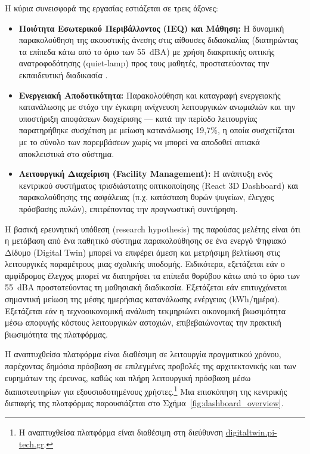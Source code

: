 Η κύρια συνεισφορά της εργασίας εστιάζεται σε τρεις άξονες:
\begin{itemize}
\item \textbf{Ποιότητα Εσωτερικού Περιβάλλοντος (\textlatin{IEQ}) και Μάθηση:} Η δυναμική παρακολούθηση της ακουστικής άνεσης στις αίθουσες διδασκαλίας (διατηρώντας τα επίπεδα κάτω από το όριο των 55~\textlatin{dBA}) με χρήση διακριτικής οπτικής ανατροφοδότησης (\textlatin{quiet-lamp}) προς τους μαθητές, προστατεύοντας την εκπαιδευτική διαδικασία \cite{WHO1999, Kephalopoulos2015}.
\item \textbf{Ενεργειακή Αποδοτικότητα:} Παρακολούθηση και καταγραφή ενεργειακής κατανάλωσης με στόχο την έγκαιρη ανίχνευση λειτουργικών ανωμαλιών και την υποστήριξη αποφάσεων διαχείρισης --- κατά την περίοδο λειτουργίας παρατηρήθηκε συσχέτιση με μείωση κατανάλωσης 19,7\%, η οποία συσχετίζεται με το σύνολο των παρεμβάσεων χωρίς να μπορεί να αποδοθεί αιτιακά αποκλειστικά στο σύστημα.
\item \textbf{Λειτουργική Διαχείριση (\textlatin{Facility Management}):} Η ανάπτυξη ενός κεντρικού συστήματος τρισδιάστατης οπτικοποίησης (\textlatin{React 3D Dashboard}) και παρακολούθησης της ασφάλειας (π.χ. κατάσταση θυρών ψυγείων, έλεγχος πρόσβασης πυλών), επιτρέποντας την προγνωστική συντήρηση.
\end{itemize}

Η βασική ερευνητική υπόθεση (\textlatin{research hypothesis}) της παρούσας μελέτης είναι ότι η μετάβαση από ένα παθητικό σύστημα παρακολούθησης σε ένα ενεργό Ψηφιακό Δίδυμο (\textlatin{Digital Twin}) μπορεί να επιφέρει άμεση και μετρήσιμη βελτίωση στις λειτουργικές παραμέτρους μιας σχολικής υποδομής. Ειδικότερα, εξετάζεται εάν ο αμφίδρομος έλεγχος μπορεί να διατηρήσει τα επίπεδα θορύβου κάτω από το όριο των 55~\textlatin{dBA} προστατεύοντας τη μαθησιακή διαδικασία. Εξετάζεται εάν επιτυγχάνεται σημαντική μείωση της μέσης ημερήσιας κατανάλωσης ενέργειας (\textlatin{kWh}/ημέρα). Εξετάζεται εάν η τεχνοοικονομική ανάλυση τεκμηριώνει οικονομική βιωσιμότητα μέσω αποφυγής κόστους λειτουργικών αστοχιών, επιβεβαιώνοντας την πρακτική βιωσιμότητα της πλατφόρμας.

Η αναπτυχθείσα πλατφόρμα είναι διαθέσιμη σε λειτουργία πραγματικού χρόνου, παρέχοντας δημόσια πρόσβαση σε επιλεγμένες προβολές της αρχιτεκτονικής και των ευρημάτων της έρευνας, καθώς και πλήρη λειτουργική πρόσβαση μέσω διαπιστευτηρίων για εξουσιοδοτημένους χρήστες.\footnote{Η αναπτυχθείσα πλατφόρμα είναι διαθέσιμη στη διεύθυνση \href{https://digitaltwin.pi-tech.gr}{\textlatin{digitaltwin.pi-tech.gr}}.} Μια επισκόπηση της κεντρικής διεπαφής της πλατφόρμας παρουσιάζεται στο Σχήμα~\ref{fig:dashboard_overview}.

